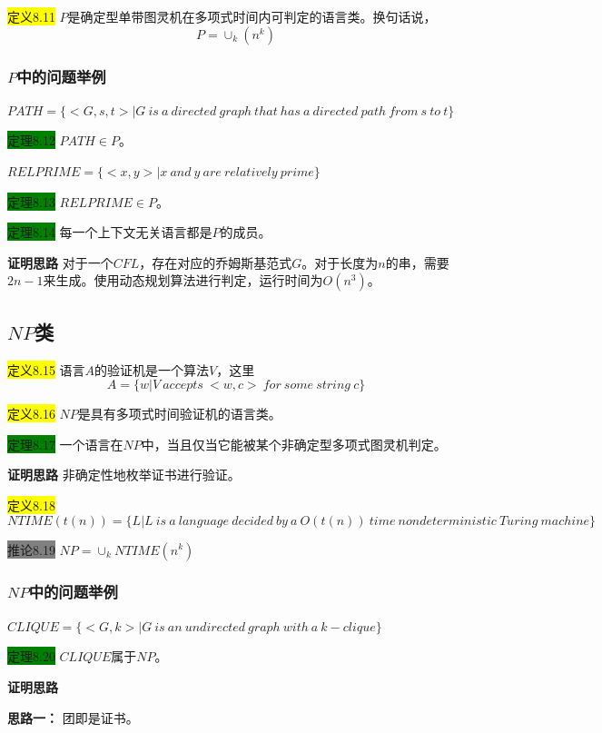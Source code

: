 \documentclass[a4paper]{article}
\begin{document}
	\colorbox{yellow}{定义8.11} $P$是确定型单带图灵机在多项式时间内可判定的语言类。换句话说，
	$$P=\cup_k(n^k)$$

\subsubsection{$P$中的问题举例}

	$PATH=\{<G,s,t>|G~is~a~directed~graph~that~has~a~directed~path~from~s~to~t\}$

	\colorbox{green}{定理8.12} $PATH \in P$。

	$RELPRIME=\{<x,y>| x~and~y~are~relatively~prime\}$
	
	\colorbox{green}{定理8.13} $RELPRIME \in P$。
	
	\colorbox{green}{定理8.14} 每一个上下文无关语言都是$P$的成员。
	
	\textbf{证明思路} \quad 对于一个$CFL$，存在对应的乔姆斯基范式$G$。对于长度为$n$的串，需要$2n-1$来生成。使用动态规划算法进行判定，运行时间为$O(n^3)$。

\subsection{$NP$类}

	\colorbox{yellow}{定义8.15} 语言$A$的验证机是一个算法$V$，这里
	$$A=\{w|V~accepts~<w,c>~for~some~string~c\}$$
	
	\colorbox{yellow}{定义8.16} $NP$是具有多项式时间验证机的语言类。

	\colorbox{green}{定理8.17} 一个语言在$NP$中，当且仅当它能被某个非确定型多项式图灵机判定。
	
	\textbf{证明思路} \quad 非确定性地枚举证书进行验证。

	\colorbox{yellow}{定义8.18}
	$$NTIME(t(n))=\{L|L~is~a~language~decided~by~a~O(t(n))~time~nondeterministic~Turing~machine\}$$

	\colorbox{gray}{推论8.19} $NP=\cup_k NTIME(n^k)$

\subsubsection{$NP$中的问题举例}

	$CLIQUE=\{<G,k>|G~is~an~undirected~graph~with~a~k-clique\}$

	\colorbox{green}{定理8.20} $CLIQUE$属于$NP$。
	
	\textbf{证明思路} 
	
		\qquad \textbf{思路一：} 团即是证书。
		
\end{document}
